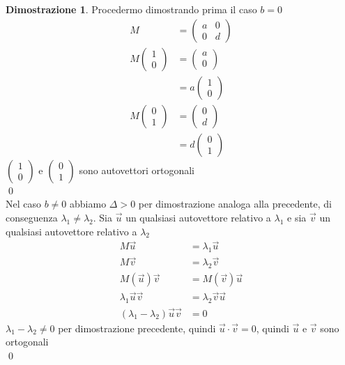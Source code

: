 \documentclass[10pt,a4paper]{article}
\theoremstyle{plain}
\theoremstyle{definition}
\newtheorem{dimostrazione}[subsection]{Dimostrazione}
\begin{document}
\begin{dimostrazione}
	Procedermo dimostrando prima il caso $b=0$
	\begin{align*}
		M&=\begin{pmatrix}
			a & 0 \\ 0 & d
		\end{pmatrix}\\
		M\begin{pmatrix}
			1 \\ 0
		\end{pmatrix}&=\begin{pmatrix}
			a \\ 0
		\end{pmatrix}
		\\
		&=a\begin{pmatrix}
		1 \\ 0
		\end{pmatrix}\\
		M\begin{pmatrix}
		0 \\ 1
		\end{pmatrix}&=\begin{pmatrix}
		0 \\ d
		\end{pmatrix}
		\\
		&=d\begin{pmatrix}
		0 \\ 1
		\end{pmatrix}
	\end{align*}
	$\begin{pmatrix}
		1 \\ 0
	\end{pmatrix}$ e $\begin{pmatrix}
		0 \\ 1
	\end{pmatrix}$ sono autovettori ortogonali\\
	\qed\\
	Nel caso $b\ne 0$ abbiamo $\Delta > 0$ per dimostrazione analoga alla precedente, di conseguenza $\lambda_1 \ne \lambda_2$. Sia $\vec{u}$ un qualsiasi autovettore relativo a $\lambda_1$ e sia $\vec{v}$ un qualsiasi autovettore relativo a $\lambda_2$
	\begin{align*}
		M\vec{u}&=\lambda_1 \vec{u} \\
		M\vec{v}&=\lambda_2 \vec{v} \\
		M(\vec{u})\vec{v}&=M(\vec{v})\vec{u} \\
		\lambda_1 \vec{u} \vec{v} &= \lambda_2 \vec{v}\vec{u} \\
		(\lambda_1 - \lambda_2)\vec{u}\vec{v} &=0
	\end{align*}
	$\lambda_1 - \lambda_2 \ne 0$ per dimostrazione precedente, quindi $\vec{u}\cdot\vec{v}=0$, quindi $\vec{u}$ e $\vec{v}$ sono ortogonali\\ \qed
\end{dimostrazione}
\end{document}
